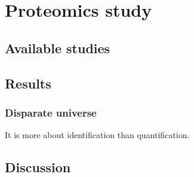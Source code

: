 \chapter{Proteomics study}
\label{ch:proteomics}

\section{Available studies}
\section{Results}
    \subsection{Disparate universe}
    It is more about identification than quantification.
\section{Discussion}


